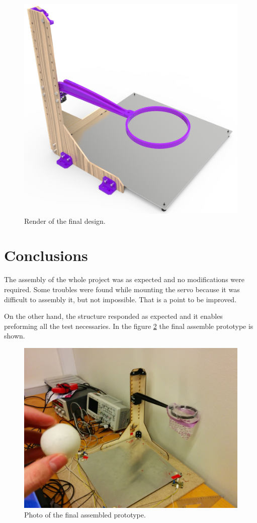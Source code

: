 		\begin{figure}[!hb]
			\begin{center}
				\includegraphics[width=.8\textwidth]{figures/render2}
			\end{center}
			\caption{Render of the final design.}
			\label{fig:render2}
		\end{figure}

	\section{Conclusions} %
	\label{sec:mechanics_conclusions}
		The assembly of the whole project was as expected and no modifications were required. Some troubles were found while mounting the servo because it was difficult to assembly it, but not impossible. That is a point to be improved.

		On the other hand, the structure responded as expected and it enables preforming all the test necessaries. In the figure \ref{fig:photo1} the final assemble prototype is shown.

		\begin{figure}[tb]
			\begin{center}
				\includegraphics[width=.8\textwidth]{figures/photo1}
			\end{center}
			\caption{Photo of the final assembled prototype.}
			\label{fig:photo1}
		\end{figure}
